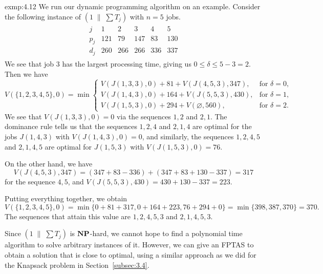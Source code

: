 \begin{exmp}{exmp:4.12}
    We run our dynamic programming algorithm on an example. Consider 
    the following instance of $(1\;\|\;\sum T_j)$ with $n = 5$ jobs. 
    \begin{align*}
        \begin{array}{c|ccccc}
            j & 1 & 2 & 3 & 4 & 5 \\ \hline 
            p_j & 121 & 79 & 147 & 83 & 130 \\ 
            d_j & 260 & 266 & 266 & 336 & 337 
        \end{array}
    \end{align*}
    We see that job $3$ has the largest processing time, giving us 
    $0 \leq \delta \leq 5 - 3 = 2$. Then we have 
    \[ V(\{1, 2, 3, 4, 5\}, 0) = \min\begin{cases} 
        V(J(1, 3, 3), 0) + 81 + V(J(4, 5, 3), 347), & \text{for } \delta = 0, \\ 
        V(J(1, 4, 3), 0) + 164 + V(J(5, 5, 3), 430), & \text{for } \delta = 1, \\ 
        V(J(1, 5, 3), 0) + 294 + V(\varnothing, 560), & \text{for } \delta = 2. 
    \end{cases} \] 
    We see that $V(J(1, 3, 3), 0) = 0$ via the sequences $1, 2$ and $2, 1$. 
    The dominance rule tells us that the sequences $1, 2, 4$ and $2, 1, 4$ 
    are optimal for the jobs $J(1, 4, 3)$ with $V(J(1, 4, 3), 0) = 0$, 
    and similarly, the sequences $1, 2, 4, 5$ and $2, 1, 4, 5$ are optimal for 
    $J(1, 5, 3)$ with $V(J(1, 5, 3), 0) = 76$.

    On the other hand, we have 
    \[ V(J(4, 5, 3), 347) = (347 + 83 - 336) + (347 + 83 + 130 - 337) = 317 \] 
    for the sequence $4, 5$, and $V(J(5, 5, 3), 430) = 430 + 130 - 337 = 223$.

    Putting everything together, we obtain 
    \[ V(\{1, 2, 3, 4, 5\}, 0) = 
    \min\{0 + 81 + 317, 0 + 164 + 223, 76 + 294 + 0\}
    = \min\{398, 387, 370\} = 370. \] 
    The sequences that attain this value are $1, 2, 4, 5, 3$ and $2, 1, 4, 5, 3$.    
\end{exmp}

Since $(1\;\|\;\sum T_j)$ is $\operatorname{\textbf{NP}}$-hard, we cannot hope to find a polynomial 
time algorithm to solve arbitrary instances of it. However, we can give an FPTAS
to obtain a solution that is close to optimal, using a similar approach 
as we did for the {\sc Knapsack} problem in Section~\ref{subsec:3.4}. 

